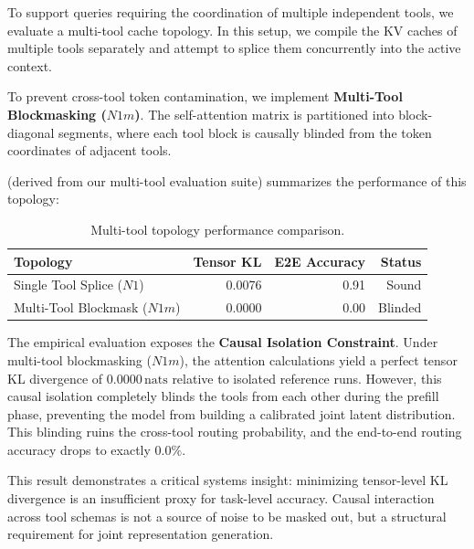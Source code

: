 To support queries requiring the coordination of multiple independent tools, we evaluate a multi-tool cache topology. In this setup, we compile the KV caches of multiple tools separately and attempt to splice them concurrently into the active context. 

To prevent cross-tool token contamination, we implement \textbf{Multi-Tool Blockmasking ($N1m$)}. The self-attention matrix is partitioned into block-diagonal segments, where each tool block is causally blinded from the token coordinates of adjacent tools.

 (derived from our multi-tool evaluation suite) summarizes the performance of this topology:
\begin{table}[h]
\centering
\caption{Multi-tool topology performance comparison.}
\label{tab:multi_tool_paradox}
\small
\begin{tabular}{lrrr}
\toprule
Topology & Tensor KL & E2E Accuracy & Status \\
\midrule
Single Tool Splice ($N1$) & 0.0076 & 0.91 & Sound \\
Multi-Tool Blockmask ($N1m$) & 0.0000 & 0.00 & Blinded \\
\bottomrule
\end{tabular}
\end{table}

The empirical evaluation exposes the \textbf{Causal Isolation Constraint}. Under multi-tool blockmasking ($N1m$), the attention calculations yield a perfect tensor KL divergence of $0.0000\,\text{nats}$ relative to isolated reference runs. However, this causal isolation completely blinds the tools from each other during the prefill phase, preventing the model from building a calibrated joint latent distribution. This blinding ruins the cross-tool routing probability, and the end-to-end routing accuracy drops to exactly $0.0\%$.

This result demonstrates a critical systems insight: minimizing tensor-level KL divergence is an insufficient proxy for task-level accuracy. Causal interaction across tool schemas is not a source of noise to be masked out, but a structural requirement for joint representation generation.
